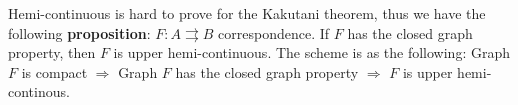 
Hemi-continuous is hard to prove for the Kakutani theorem, thus we have the following \textbf{proposition}:
$F: A\rightrightarrows B$ correspondence. 
If $F$ has the closed graph property, then $F$ is upper hemi-continuous.
The scheme is as the following: Graph $F$ is compact $\Rightarrow$ Graph $F$ has the closed graph property $\Rightarrow$ $F$ is upper hemi-continous.

